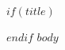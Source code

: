 \documentclass[10pt, a4paper]{article}
\begin{document}
$if(title)$\maketitle$endif$
$body$
\end{document}
